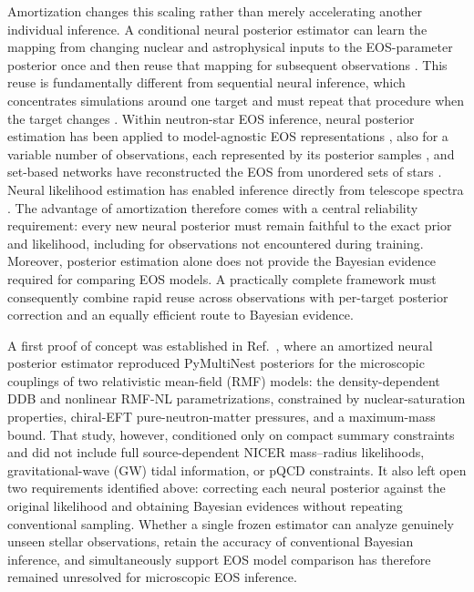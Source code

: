 \documentclass[aps,prd,twocolumn,superscriptaddress,nofootinbib,longbibliography]{revtex4-2}
\begin{document}
Amortization changes this scaling rather than merely
accelerating another individual inference. A conditional neural posterior
estimator can learn the mapping from changing nuclear and astrophysical inputs
to the EOS-parameter posterior once and then reuse that mapping for subsequent
observations \cite{Cranmer:2019eaq,Dax:2023ozk,Thakur:2026dpr}.
This reuse is
fundamentally different from sequential neural inference, which concentrates
simulations around one target and must repeat that procedure when the target
changes \cite{Deistler:2022tsnpe}.
Within neutron-star EOS inference, neural posterior
estimation has been applied to model-agnostic EOS representations
\cite{Carvalho:2025qie}, also for a variable number of observations, each
represented by its posterior samples \cite{Carvalho:2026nbl}, and set-based
networks have reconstructed the EOS from unordered sets of stars
\cite{Ferreira:2026bwb}. Neural likelihood estimation has enabled
inference directly from telescope spectra \cite{Brandes:2024vhw}.
The advantage of amortization therefore
comes with a central reliability requirement: every new neural posterior must
remain faithful to the exact prior and likelihood, including for observations
not encountered during training. Moreover, posterior estimation alone does
not provide the Bayesian evidence required for comparing EOS models. A
practically complete framework must consequently combine rapid reuse across
observations with per-target posterior correction and an equally efficient
route to Bayesian evidence.

A first proof of concept was established in
Ref.~\cite{Thakur:2026dpr}, where an amortized neural posterior estimator
reproduced PyMultiNest posteriors for the microscopic couplings of
two relativistic mean-field (RMF) models: the density-dependent DDB and
nonlinear RMF-NL parametrizations, constrained by nuclear-saturation
properties, chiral-EFT
pure-neutron-matter pressures, and a maximum-mass bound.
That study, however, conditioned only on compact
summary constraints and did not include full source-dependent NICER
mass--radius likelihoods, gravitational-wave (GW) tidal information, or pQCD
constraints. It also left open two requirements identified above: correcting
each neural posterior against the original likelihood and obtaining Bayesian
evidences without repeating conventional sampling. Whether a single frozen
estimator can analyze genuinely unseen stellar observations, retain the
accuracy of conventional Bayesian inference, and simultaneously support EOS
model comparison has therefore remained unresolved for microscopic EOS
inference.
\end{document}
